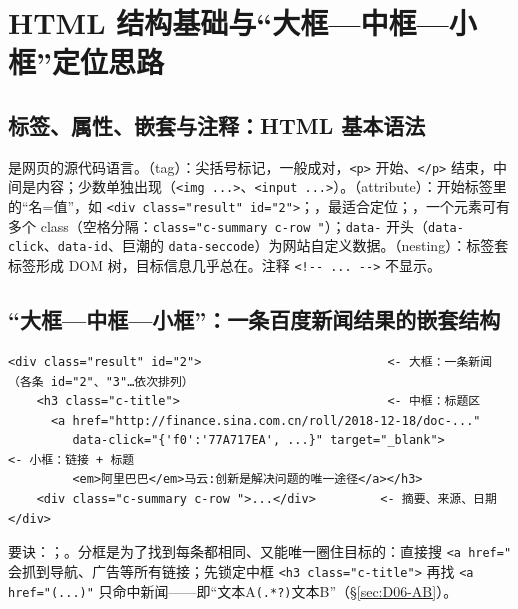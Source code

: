 \section{HTML 结构基础与“大框—中框—小框”定位思路}

\subsection{标签、属性、嵌套与注释：HTML 基本语法}
是网页的源代码语言。（tag）：尖括号标记，一般成对，\texttt{<p>} 开始、\texttt{</p>} 结束，中间是内容；少数单独出现（\texttt{<img ...>}、\texttt{<input ...>}）。（attribute）：开始标签里的“名=值”，如 \texttt{<div class="result" id="2">}；，最适合定位；，一个元素可有多个 class（空格分隔：\texttt{class="c-summary c-row "}）；\texttt{data-} 开头（\texttt{data-click}、\texttt{data-id}、巨潮的 \texttt{data-seccode}）为网站自定义数据。（nesting）：标签套标签形成 DOM 树，目标信息几乎总在。注释 \texttt{<!-{}- ... -{}->} 不显示。

\subsection{“大框—中框—小框”：一条百度新闻结果的嵌套结构}\label{sec:D06-box}
\begin{lstlisting}[style=txtD06]
<div class="result" id="2">                          <- 大框：一条新闻（各条 id="2"、"3"…依次排列）
    <h3 class="c-title">                             <- 中框：标题区
      <a href="http://finance.sina.com.cn/roll/2018-12-18/doc-..."
         data-click="{'f0':'77A717EA', ...}" target="_blank">        <- 小框：链接 + 标题
         <em>阿里巴巴</em>马云:创新是解决问题的唯一途径</a></h3>
    <div class="c-summary c-row ">...</div>         <- 摘要、来源、日期
</div>
\end{lstlisting}
要诀：；。分框是为了找到每条都相同、又能唯一圈住目标的：直接搜 \texttt{<a href="} 会抓到导航、广告等所有链接；先锁定中框 \texttt{<h3 class="c-title">} 再找 \texttt{<a href="(...)"} 只命中新闻——即“文本A\texttt{(.*?)}文本B”（§\ref{sec:D06-AB}）。

